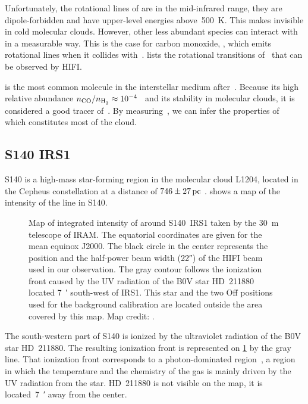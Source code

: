 Unfortunately, the rotational lines of  are in the mid-infrared range, they are dipole-forbidden and have upper-level energies above~\SI{500}{\kelvin}.
This makes  invisible in cold molecular clouds.
However, other less abundant species can interact with  in a measurable way.
This is the case for carbon monoxide, , which emits rotational lines when it collides with~.
 lists the rotational transitions of~ that can be observed by HIFI.

 is the most common molecule in the interstellar medium after~.
Because its high relative abundance $n_\text{\ce{CO}} / n_\text{\ce{H2}} \approx 10^{-4}$~\parencite{tielens2005physics} and its stability in molecular clouds, it is considered a good tracer of~.
By measuring~, we can infer the properties of~ which constitutes most of the cloud.



\subsection{S140 IRS1}
\label{sec:s140irs1}
S140 is a high-mass star-forming region in the molecular cloud L1204,
located in the Cepheus constellation at a distance of $746\pm\SI{27}{pc}$ \parencite{hirota2008}.
 shows a map of the intensity of the  line in S140.

\begin{figure}
    \centering
    
    \caption{
        Map of integrated intensity of  around S140~IRS1 taken by the \SI{30}{\meter} telescope of IRAM.
        The equatorial coordinates are given for the mean equinox J2000.
        The black circle in the center represents the position and the half-power beam width (\ang{;;22}) of the HIFI beam used in our observation.
        The gray contour follows the ionization front caused by the UV radiation of the B0V star HD~211880 located \SI{7}{\arcmin} south-west of IRS1.
        This star and the two Off positions used for the background calibration are located outside the area covered by this map.
        Map credit: \textcite{koumpia2015}.
    }
    \label{fig:12CO10_moment0}
\end{figure}

The south-western part of S140 is ionized by the ultraviolet radiation of the B0V star HD~211880.
The resulting ionization front is represented on \cref{fig:12CO10_moment0} by the gray line.
That ionization front corresponds to a photon-dominated region~\parencite{hollenbach1997dense}, a region in which the temperature and the chemistry of the gas is mainly driven by the UV radiation from the star.
HD~211880 is not visible on the map, it is located~\SI{7}{\arcmin} away from the center.

